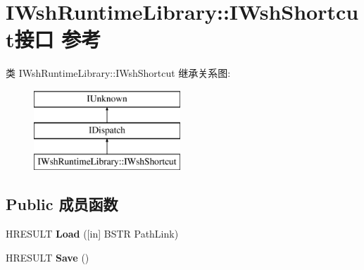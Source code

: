 \hypertarget{interface_i_wsh_runtime_library_1_1_i_wsh_shortcut}{}\section{I\+Wsh\+Runtime\+Library\+:\+:I\+Wsh\+Shortcut接口 参考}
\label{interface_i_wsh_runtime_library_1_1_i_wsh_shortcut}
类 I\+Wsh\+Runtime\+Library\+:\+:I\+Wsh\+Shortcut 继承关系图\+:\begin{figure}[H]
\begin{center}
\leavevmode
\includegraphics[height=3.000000cm]{interface_i_wsh_runtime_library_1_1_i_wsh_shortcut}
\end{center}
\end{figure}
\subsection*{Public 成员函数}
\begin{DoxyCompactItemize}
\item 
\mbox{\label{interface_i_wsh_runtime_library_1_1_i_wsh_shortcut_ab3a040ac3472b329611f9604d619e67b}} 
H\+R\+E\+S\+U\+LT {\bfseries Load} (\mbox{[}in\mbox{]} B\+S\+TR Path\+Link)
\item 
\mbox{\label{interface_i_wsh_runtime_library_1_1_i_wsh_shortcut_a0b3943b2efa393274759949024cf5422}} 
H\+R\+E\+S\+U\+LT {\bfseries Save} ()
\end{DoxyCompactItemize}
